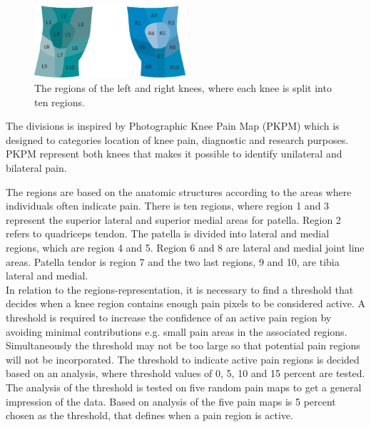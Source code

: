 \begin{figure} [h] 
\centering
\includegraphics[width=0.5\textwidth]{Figures/atlas}
\caption{The regions of the left and right knees, where each knee is split into ten regions.}
\label{fig:atlas}
\end{figure}

\noindent
The divisions is inspired by Photographic Knee Pain Map (PKPM) which is designed to categories location of knee pain, diagnostic and research purposes. PKPM represent both knees that makes it possible to identify unilateral and bilateral pain.\citep{Elson2010}

\noindent
The regions are based on the anatomic structures according to the areas where individuals often indicate pain.
There is ten regions, where region 1 and 3 represent the superior lateral and superior medial areas for patella. Region 2 refers to quadriceps tendon. The patella is divided into lateral and medial regions, which are region 4 and 5. Region 6 and 8 are lateral and medial joint line areas. Patella tendor is region 7 and the two last regions, 9 and 10, are tibia lateral and medial.\citep{Elson2010}\\

\noindent
In relation to the regions-representation, it is necessary to find a threshold that decides when a knee region contains enough pain pixels to be considered active. A threshold is required to increase the confidence of an active pain region by avoiding minimal contributions e.g. small pain areas in the associated regions. Simultaneously the threshold may not be too large so that potential pain regions will not be incorporated. The threshold to indicate active pain regions is decided based on an analysis, where threshold values of 0, 5, 10 and 15 percent are tested. The analysis of the threshold is tested on five random pain maps to get a general impression of the data. Based on analysis of the five pain maps is 5 percent chosen as the threshold, that defines when a pain region is active. \\

